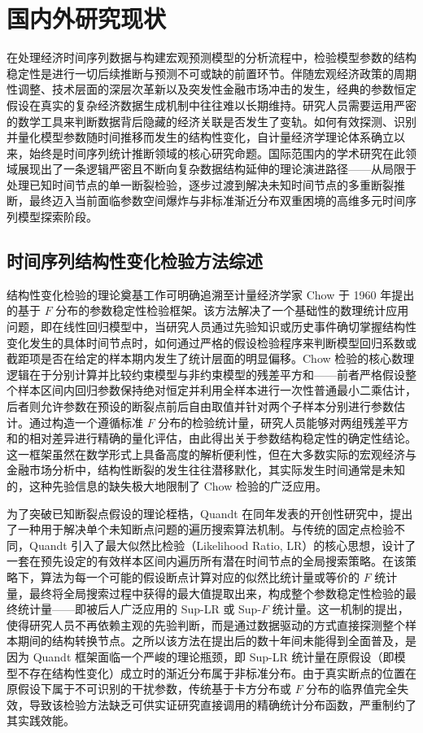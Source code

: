\section{国内外研究现状}

在处理经济时间序列数据与构建宏观预测模型的分析流程中，检验模型参数的结构稳定性是进行一切后续推断与预测不可或缺的前置环节。伴随宏观经济政策的周期性调整、技术层面的深层次革新以及突发性金融市场冲击的发生，经典的参数恒定假设在真实的复杂经济数据生成机制中往往难以长期维持。研究人员需要运用严密的数学工具来判断数据背后隐藏的经济关联是否发生了变轨。如何有效探测、识别并量化模型参数随时间推移而发生的结构性变化，自计量经济学理论体系确立以来，始终是时间序列统计推断领域的核心研究命题。国际范围内的学术研究在此领域展现出了一条逻辑严密且不断向复杂数据结构延伸的理论演进路径——从局限于处理已知时间节点的单一断裂检验，逐步过渡到解决未知时间节点的多重断裂推断，最终迈入当前面临参数空间爆炸与非标准渐近分布双重困境的高维多元时间序列模型探索阶段。

\subsection{时间序列结构性变化检验方法综述}

结构性变化检验的理论奠基工作可明确追溯至计量经济学家 Chow 于 1960 年提出的基于 $F$ 分布的参数稳定性检验框架。该方法解决了一个基础性的数理统计应用问题，即在线性回归模型中，当研究人员通过先验知识或历史事件确切掌握结构性变化发生的具体时间节点时，如何通过严格的假设检验程序来判断模型回归系数或截距项是否在给定的样本期内发生了统计层面的明显偏移。Chow 检验的核心数理逻辑在于分别计算并比较约束模型与非约束模型的残差平方和——前者严格假设整个样本区间内回归参数保持绝对恒定并利用全样本进行一次性普通最小二乘估计，后者则允许参数在预设的断裂点前后自由取值并针对两个子样本分别进行参数估计。通过构造一个遵循标准 $F$ 分布的检验统计量，研究人员能够对两组残差平方和的相对差异进行精确的量化评估，由此得出关于参数结构稳定性的确定性结论。这一框架虽然在数学形式上具备高度的解析便利性，但在大多数实际的宏观经济与金融市场分析中，结构性断裂的发生往往潜移默化，其实际发生时间通常是未知的，这种先验信息的缺失极大地限制了 Chow 检验的广泛应用。

为了突破已知断裂点假设的理论桎梏，Quandt 在同年发表的开创性研究中，提出了一种用于解决单个未知断点问题的遍历搜索算法机制。与传统的固定点检验不同，Quandt 引入了最大似然比检验（Likelihood Ratio, LR）的核心思想，设计了一套在预先设定的有效样本区间内遍历所有潜在时间节点的全局搜索策略。在该策略下，算法为每一个可能的假设断点计算对应的似然比统计量或等价的 $F$ 统计量，最终将全局搜索过程中获得的最大值提取出来，构成整个参数稳定性检验的最终统计量——即被后人广泛应用的 Sup-LR 或 Sup-$F$ 统计量。这一机制的提出，使得研究人员不再依赖主观的先验判断，而是通过数据驱动的方式直接探测整个样本期间的结构转换节点。之所以该方法在提出后的数十年间未能得到全面普及，是因为 Quandt 框架面临一个严峻的理论瓶颈，即 Sup-LR 统计量在原假设（即模型不存在结构性变化）成立时的渐近分布属于非标准分布。由于真实断点的位置在原假设下属于不可识别的干扰参数，传统基于卡方分布或 $F$ 分布的临界值完全失效，导致该检验方法缺乏可供实证研究直接调用的精确统计分布函数，严重制约了其实践效能。

